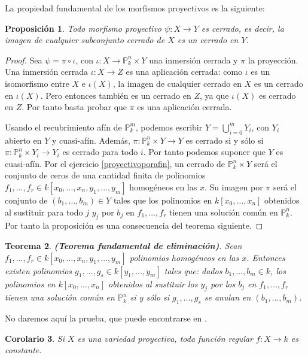 \documentclass[a4paper,10pt]{book}
\newtheorem{thm}{Teorema}[chapter]
\newtheorem{cor}[thm]{Corolario}
\newtheorem{prop}[thm]{Proposición}
\newcommand{\PP}{\mathbb P}
\newcommand{\Pnk}{\PP^n_k}
\newcommand{\Pmk}{\PP^m_k}
\begin{document}
La propiedad fundamental de los morfismos proyectivos es la siguiente:

\begin{prop}\label{proyectivocerrado}
 Todo morfismo proyectivo $\psi:X\to Y$ es cerrado, es decir, la imagen de cualquier subconjunto cerrado de $X$ es un cerrado en $Y$.
\end{prop}

\begin{proof}
 Sea $\psi=\pi\circ\iota$, con $\iota:X\to \Pnk\times Y$ una inmersión cerrada y $\pi$ la proyección. Una inmersión cerrada $\iota:X\to Z$ es una aplicación cerrada: como $\iota$ es un isomorfismo entre $X$ e $\iota(X)$, la imagen de cualquier cerrado en $X$ es un cerrado en $\iota(X)$. Pero entonces también es un cerrado en $Z$, ya que $\iota(X)$ es cerrado en $Z$. Por tanto basta probar que $\pi$ es una aplicación cerrada.

Usando el recubrimiento afín de $\Pmk$, podemos escribir $Y=\bigcup_{i=0}^m Y_i$, con $Y_i$ abierto en $Y$ y cuasi-afín. Además, $\pi:\Pnk\times Y\to Y$ es cerrado si y sólo si $\pi:\Pnk\times Y_i\to Y_i$ es cerrado para todo $i$. Por tanto podemos suponer que $Y$ es cuasi-afín. Por el ejercicio \ref{proyectivoporafin}, un cerrado de $\Pnk\times Y$ será el conjunto de ceros de una cantidad finita de polinomios $f_1,\ldots,f_r\in k[x_0,\ldots,x_n,y_1,\ldots,y_m]$ homogéneos en las $x$. Su imagen por $\pi$ será el conjunto de $(b_1,\ldots,b_m)\in Y$ tales que los polinomios en $k[x_0,\ldots,x_n]$ obtenidos al sustituir para todo $j$ $y_j$ por $b_j$ en $f_1,\ldots,f_r$ tienen una solución común en $\Pnk$. Por tanto la proposición es una consecuencia del teorema siguiente.
\end{proof}


\begin{thm} \label{eliminacion} {\bf (Teorema fundamental de eliminación)}. Sean $f_1,\ldots,f_r\in k[x_0,\ldots,x_n,y_1,\ldots,y_m]$ polinomios homogéneos en las $x$. Entonces existen polinomios $g_1,\ldots,g_s\in k[y_1,\ldots,y_m]$ tales que: dados $b_1,\ldots,b_m\in k$, los polinomios en $k[x_0,\ldots,x_n]$ obtenidos al sustituir los $y_j$ por los $b_j$ en $f_1,\ldots,f_r$ tienen una solución común en $\Pnk$ si y sólo si $g_1,\ldots,g_s$ se anulan en $(b_1,\ldots,b_m)$.
 \end{thm}

No daremos aquí la prueba, que puede encontrarse en \cite[I.5.2]{sha}.

\begin{cor}
 Si $X$ es una variedad proyectiva, toda función regular $f:X\to k$ es constante.
\end{cor}
\end{document}
